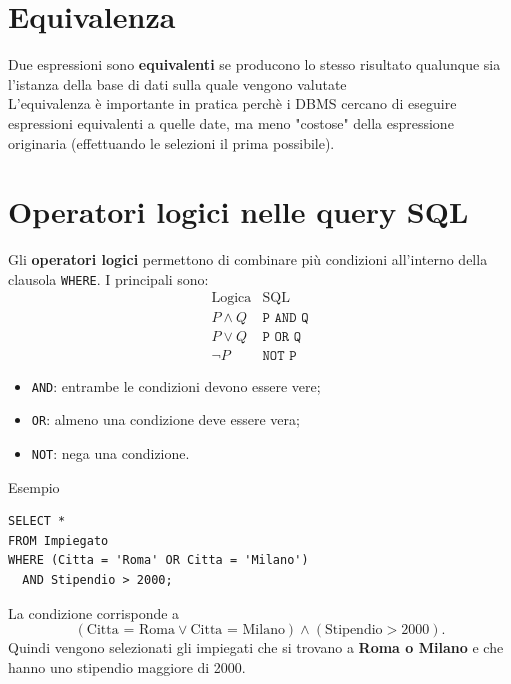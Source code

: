 \section{Equivalenza}
Due espressioni sono \textbf{equivalenti} se producono lo stesso risultato qualunque sia l'istanza della base di dati sulla quale vengono valutate\\
L'equivalenza è importante in pratica perchè i DBMS cercano di eseguire espressioni equivalenti a quelle date, ma meno "costose" della espressione originaria (effettuando le selezioni il prima possibile).

\section{Operatori logici nelle query SQL}
Gli \textbf{operatori logici} permettono di combinare più condizioni
all'interno della clausola \texttt{WHERE}. I principali sono:
\[
\begin{array}{c|c}
\text{Logica} & \text{SQL} \\ \hline
P \land Q & \texttt{P AND Q} \\
P \lor Q & \texttt{P OR Q} \\
\neg P & \texttt{NOT P}
\end{array}
\]
\begin{itemize}
    \item \texttt{AND}: entrambe le condizioni devono essere vere;
    \item \texttt{OR}: almeno una condizione deve essere vera;
    \item \texttt{NOT}: nega una condizione.
\end{itemize}
\noindent \textcolor{verdeEsempio}{Esempio}
\begin{verbatim}
SELECT *
FROM Impiegato
WHERE (Citta = 'Roma' OR Citta = 'Milano')
  AND Stipendio > 2000;
\end{verbatim}
La condizione corrisponde a
\[
(\text{Citta = Roma} \lor \text{Citta = Milano})
\land
(\text{Stipendio} > 2000).
\]
Quindi vengono selezionati gli impiegati che si trovano a
\textbf{Roma o Milano} e che hanno uno stipendio maggiore di 2000.
